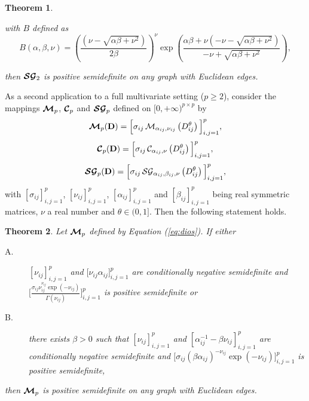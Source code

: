 \documentclass[12pt]{article}
\theoremstyle{plain}
\newtheorem{theorem}{Theorem}[section]
\theoremstyle{remark}
\newcommand{\latMatr}[1]{\mathbf{#1}}          %
\begin{document}
\begin{theorem}
\begin{description}
\begin{equation*}
            \end{equation*}
            with $B$ defined as 
            \begin{equation*}
                \label{eq:bound2} 
                B(\alpha,\beta, \nu) = \left ( \frac{\left ( \nu - \sqrt{\alpha\beta+\nu^2} \right )}{2 \beta} \right )^{\nu} \exp \left ( \frac{\alpha \beta + \nu (-\nu- \sqrt{\alpha \beta + \nu^2})}{- \nu + \sqrt{\alpha \beta + \nu^2}}   \right ),
            \end{equation*} 
        \end{description}
        then $\boldsymbol{{\cal SG}}_2$ is positive semidefinite on any graph with Euclidean edges.
    \end{theorem}
    

     {As a second application to a full multivariate setting ($p \geq 2$), consider the mappings $\boldsymbol{{\cal M}}_p$, $\boldsymbol{{\cal C}}_p$ and $\boldsymbol{{\cal SG}}_p$ defined on $[0,+\infty)^{p \times p}$ by
    \begin{equation}
    \label{eq:dios}
        \boldsymbol{{\cal M}}_p(\latMatr{D}) = \Big[\sigma_{ij} \, {\cal M}_{\alpha_{ij},\nu_{ij}}\left(D_{ij}^\theta \right) \Big]_{i,j=1}^p,
    \end{equation}
    \begin{equation}
    \label{eq:dios2}
        \boldsymbol{{\cal C}}_p(\latMatr{D}) = \Big[\sigma_{ij} \, {\cal C}_{\alpha_{ij},\nu}\left(D_{ij}^\theta \right) \Big]_{i,j=1}^p,
    \end{equation}
    \begin{equation}
        \label{eq:dios3}
        \boldsymbol{{\cal SG}}_p(\latMatr{D}) = \Big[\sigma_{ij} \, {\cal SG}_{\alpha_{ij},\beta_{ij},\nu}\left(D_{ij}^\theta \right) \Big]_{i,j=1}^p,
    \end{equation}
    with $[\sigma_{ij}]_{i,j=1}^p$, $[\nu_{ij}]_{i,j=1}^p$, $[\alpha_{ij}]_{i,j=1}^p$ and $[\beta_{ij}]_{i,j=1}^p$ being real symmetric matrices, $\nu$ a real number {and $\theta \in (0,1]$}.} Then {the following statement holds.}
    \begin{theorem} 
        \label{theo:dios}
        Let $\boldsymbol{{\cal M}}_p$ defined by Equation (\ref{eq:dios}). 
        If either
        \begin{description}
            \item[A.] $[\nu_{ij}]_{i,j=1}^p$             and $\big[\nu_{ij}\alpha_{ij}\big]_{i,j=1}^p$ are conditionally negative semidefinite 
            and $\Big[\frac{\sigma_{ij} \nu_{ij}^{\nu_{ij}} \exp(-\nu_{ij})}{ \Gamma(\nu_{ij})}\Big]_{i,j=1}^p$ is positive semidefinite or 
            \item[B.] there exists $\beta>0$ such that $[\nu_{ij}]_{i,j=1}^p$             and $[\alpha_{ij}^{-1}-\beta \nu_{ij}]_{i,j=1}^p$ are conditionally negative semidefinite 
            and $\big[\sigma_{ij} (\beta \alpha_{ij} )^{-\nu_{ij}} \exp(-\nu_{ij}) \big]_{i,j=1}^p$ is positive semidefinite,
        \end{description}
        then $\boldsymbol{{\cal M}}_p$ is positive semidefinite on any graph with Euclidean edges.
    \end{theorem}
\end{document}
